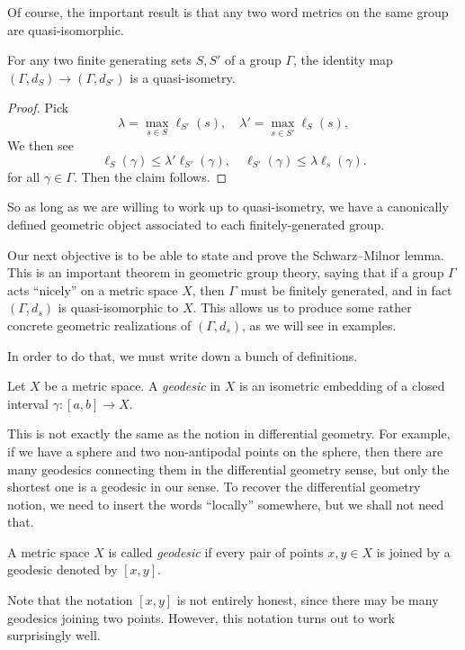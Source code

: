 \documentclass[a4paper]{article}
\begin{document}
Of course, the important result is that any two word metrics on the same group are quasi-isomorphic.
\begin{thm}
  For any two finite generating sets $S, S'$ of a group $\Gamma$, the identity map $(\Gamma, d_S) \to (\Gamma, d_{S'})$ is a quasi-isometry.
\end{thm}

\begin{proof}
  Pick
  \[
    \lambda = \max_{s \in S} \ell_{S'}(s),\quad \lambda' = \max_{s \in S'} \ell_{S}(s),
  \]
  We then see
  \[
    \ell_S(\gamma) \leq \lambda' \ell_{S'}(\gamma), \quad \ell_{S'}(\gamma) \leq \lambda \ell_s(\gamma). %
  \]
  for all $\gamma \in \Gamma$. Then the claim follows.
\end{proof}
So as long as we are willing to work up to quasi-isometry, we have a canonically defined geometric object associated to each finitely-generated group.

Our next objective is to be able to state and prove the Schwarz--Milnor lemma. This is an important theorem in geometric group theory, saying that if a group $\Gamma$ acts ``nicely'' on a metric space $X$, then $\Gamma$ must be finitely generated, and in fact $(\Gamma, d_s)$ is quasi-isomorphic to $X$. This allows us to produce some rather concrete geometric realizations of $(\Gamma, d_s)$, as we will see in examples.

In order to do that, we must write down a bunch of definitions.

\begin{defi}[Geodesic]
  Let $X$ be a metric space. A \emph{geodesic} in $X$ is an isometric embedding of a closed interval $\gamma: [a, b] \to X$.
\end{defi}
This is not exactly the same as the notion in differential geometry. For example, if we have a sphere and two non-antipodal points on the sphere, then there are many geodesics connecting them in the differential geometry sense, but only the shortest one is a geodesic in our sense. To recover the differential geometry notion, we need to insert the words ``locally'' somewhere, but we shall not need that.

\begin{defi}
  A metric space $X$ is called \emph{geodesic} if every pair of points $x, y \in X$ is joined by a geodesic denoted by $[x, y]$.
\end{defi}
Note that the notation $[x, y]$ is not entirely honest, since there may be many geodesics joining two points. However, this notation turns out to work surprisingly well.
\end{document}
